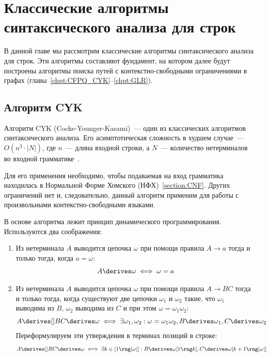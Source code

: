 \setchapterpreamble[u]{\margintoc}
\chapter{Классические алгоритмы синтаксического анализа для строк}

В данной главе мы рассмотрим классические алгоритмы синтаксического анализа для строк.
Эти алгоритмы составляют фундамент, на котором далее будут построены алгоритмы поиска путей с контекстно-свободными ограничениями в графах (главы~\ref{chpt:CFPQ_CYK}--\ref{chpt:GLR}).

\section{Алгоритм CYK}
\label{sect:lin_CYK}

Алгоритм CYK (Cocke-Younger-Kasami)~--- один из классических алгоритмов синтаксического анализа.
Его асимптотическая сложность в худшем случае~--- $O(n^3 \cdot |N|)$, где $n$~--- длина входной строки, а $N$~--- количество нетерминалов во входной грамматике~.

Для его применения необходимо, чтобы подаваемая на вход грамматика находилась в Нормальной Форме Хомского (НФХ)~\ref{section:CNF}.
Других ограничений нет и, следовательно, данный алгоритм применим для работы с произвольными контекстно-свободными языками.

В основе алгоритма лежит принцип динамического программирования.
Используются два соображения:
\begin{enumerate}
    \item Из нетерминала $A$ выводится цепочка $\omega$ при помощи правила $A \to a$ тогда и только тогда, когда $a = \omega$:
          \[ A \derives \omega \iff \omega = a \]
    \item Из нетерминала $A$ выводится цепочка $\omega$ при помощи правила $A \to B C$ тогда и только тогда, когда существуют две цепочки $\omega_1$ и $\omega_2$ такие, что $\omega_1$ выводима из $B$, $\omega_2$ выводима из $C$ и при этом $\omega = \omega_1 \omega_2$:
          \[ A \derives[] B C \derives \omega \iff \exists \omega_1, \omega_2 : \omega = \omega_1 \omega_2, B \derives \omega_1, C \derives \omega_2 \]
          Переформулируем эти утверждения в терминах позиций в строке:
          \[ A \derives[] B C \derives \omega \iff \exists k \in [1 \rng |\omega|] : B \derives \omega[1 \rng k], C \derives \omega[k+1 \rng |\omega|] \]
\end{enumerate}

